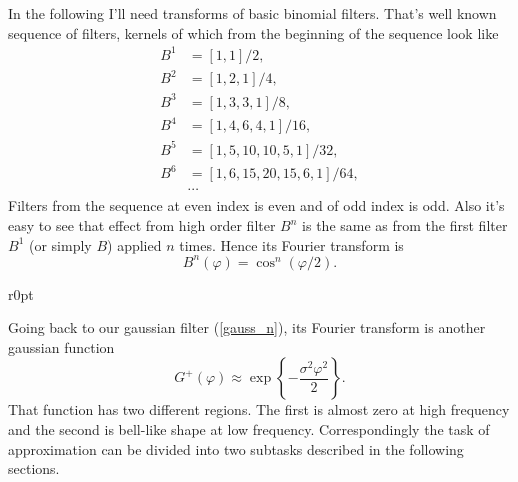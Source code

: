 \documentclass[10pt]{article}
\begin{document}
In the following I'll need transforms of basic binomial filters. That's well known sequence of
filters, kernels of which from the beginning of the sequence look like
\begin{align}
    B^1 &= [1, 1] / 2,\\
    B^2 &= [1, 2, 1] / 4,\\
    B^3 &= [1, 3, 3, 1] / 8,\\
    B^4 &= [1, 4, 6, 4, 1] / 16,\\
    B^5 &= [1, 5, 10, 10, 5, 1] / 32,\\
    B^6 &= [1, 6, 15, 20, 15, 6, 1] / 64,\\
            &\cdots\nonumber
\end{align}
Filters from the sequence at even index is even and of odd index is odd. Also it's easy to see that
effect from high order filter $B^n$ is the same as from the first filter $B^1$ (or simply $B$) applied
$n$ times. Hence its Fourier transform is
\begin{equation}
    B^n(\varphi) = \cos^n(\varphi/2).
\end{equation}

\begin{wrapfigure}{r}{0pt}
\end{wrapfigure}

Going back to our gaussian filter (\ref{gauss_n}), its Fourier transform is another gaussian function
\begin{equation}\label{gauss}
    G^+(\varphi) \approx \exp\left\{-\frac{\sigma^2\varphi^2}2\right\}.
\end{equation}
That function has two different regions. The first is almost zero at high frequency and the second
is bell-like shape at low frequency. Correspondingly the task of approximation can be divided into
two subtasks described in the following sections.
\end{document}
